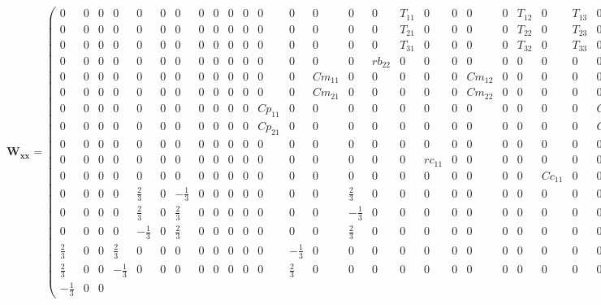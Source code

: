 \[ \mathbf{W_{xx}} = \left(\begin{smallmatrix} 0 & 0 & 0 & 0 & 0 & 0 &
0 & 0 & 0 & 0 & 0 & 0 & 0 & 0 & 0 & 0 & T_{11} & 0 & 0 & 0 & 0 &
T_{12} & 0 & T_{13} & 0 & 0 \\ 0 & 0 & 0 & 0 & 0 & 0 & 0 & 0 & 0 & 0 &
0 & 0 & 0 & 0 & 0 & 0 & T_{21} & 0 & 0 & 0 & 0 & T_{22} & 0 & T_{23} &
0 & 0 \\ 0 & 0 & 0 & 0 & 0 & 0 & 0 & 0 & 0 & 0 & 0 & 0 & 0 & 0 & 0 & 0
& T_{31} & 0 & 0 & 0 & 0 & T_{32} & 0 & T_{33} & 0 & 0 \\ 0 & 0 & 0 &
0 & 0 & 0 & 0 & 0 & 0 & 0 & 0 & 0 & 0 & 0 & 0 & rb_{22} & 0 & 0 & 0 &
0 & 0 & 0 & 0 & 0 & 0 & 0 \\ 0 & 0 & 0 & 0 & 0 & 0 & 0 & 0 & 0 & 0 & 0
& 0 & 0 & Cm_{11} & 0 & 0 & 0 & 0 & 0 & Cm_{12} & 0 & 0 & 0 & 0 & 0 &
0 \\ 0 & 0 & 0 & 0 & 0 & 0 & 0 & 0 & 0 & 0 & 0 & 0 & 0 & Cm_{21} & 0 &
0 & 0 & 0 & 0 & Cm_{22} & 0 & 0 & 0 & 0 & 0 & 0 \\ 0 & 0 & 0 & 0 & 0 &
0 & 0 & 0 & 0 & 0 & 0 & Cp_{11} & 0 & 0 & 0 & 0 & 0 & 0 & 0 & 0 & 0 &
0 & 0 & 0 & Cp_{12} & 0 \\ 0 & 0 & 0 & 0 & 0 & 0 & 0 & 0 & 0 & 0 & 0 &
Cp_{21} & 0 & 0 & 0 & 0 & 0 & 0 & 0 & 0 & 0 & 0 & 0 & 0 & Cp_{22} & 0
\\ 0 & 0 & 0 & 0 & 0 & 0 & 0 & 0 & 0 & 0 & 0 & 0 & 0 & 0 & 0 & 0 & 0 &
0 & 0 & 0 & 0 & 0 & 0 & 0 & 0 & rx_{11} \\ 0 & 0 & 0 & 0 & 0 & 0 & 0 &
0 & 0 & 0 & 0 & 0 & 0 & 0 & 0 & 0 & 0 & rc_{11} & 0 & 0 & 0 & 0 & 0 &
0 & 0 & 0 \\ 0 & 0 & 0 & 0 & 0 & 0 & 0 & 0 & 0 & 0 & 0 & 0 & 0 & 0 & 0
& 0 & 0 & 0 & 0 & 0 & 0 & 0 & Cc_{11} & 0 & 0 & 0 \\ 0 & 0 & 0 & 0 &
\frac{2}{3} & 0 & -\frac{1}{3} & 0 & 0 & 0 & 0 & 0 & 0 & 0 &
\frac{2}{3} & 0 & 0 & 0 & 0 & 0 & 0 & 0 & 0 & 0 & 0 & 0 \\ 0 & 0 & 0 &
0 & \frac{2}{3} & 0 & \frac{2}{3} & 0 & 0 & 0 & 0 & 0 & 0 & 0 &
-\frac{1}{3} & 0 & 0 & 0 & 0 & 0 & 0 & 0 & 0 & 0 & 0 & 0 \\ 0 & 0 & 0
& 0 & -\frac{1}{3} & 0 & \frac{2}{3} & 0 & 0 & 0 & 0 & 0 & 0 & 0 &
\frac{2}{3} & 0 & 0 & 0 & 0 & 0 & 0 & 0 & 0 & 0 & 0 & 0 \\ \frac{2}{3}
& 0 & 0 & \frac{2}{3} & 0 & 0 & 0 & 0 & 0 & 0 & 0 & 0 & -\frac{1}{3} &
0 & 0 & 0 & 0 & 0 & 0 & 0 & 0 & 0 & 0 & 0 & 0 & 0 \\ \frac{2}{3} & 0 &
0 & -\frac{1}{3} & 0 & 0 & 0 & 0 & 0 & 0 & 0 & 0 & \frac{2}{3} & 0 & 0
& 0 & 0 & 0 & 0 & 0 & 0 & 0 & 0 & 0 & 0 & 0 \\ -\frac{1}{3} & 0 & 0 &

\end{smallmatrix}\]
